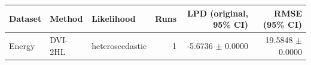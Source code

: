 \begin{tabular}{lllrrr}
\toprule
Dataset & Method & Likelihood & Runs & LPD (original, 95\% CI) & RMSE (95\% CI) \\
\midrule
Energy & DVI-2HL & heteroscedastic & 1 & -5.6736 $\pm$ 0.0000 & 19.5848 $\pm$ 0.0000 \\
\bottomrule
\end{tabular}
